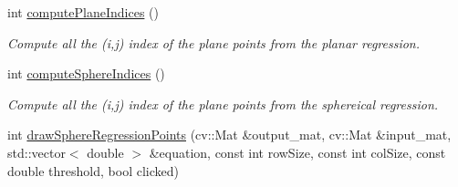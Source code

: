 \begin{DoxyCompactItemize}
int \hyperlink{class_plane_a24415419c0c06e83f2016246a8d2ee40}{compute\+Plane\+Indices} ()
\begin{DoxyCompactList}\small\item\em Compute all the (i,j) index of the plane points from the planar regression. \end{DoxyCompactList}\item 
int \hyperlink{class_plane_a279bfd98317431edcdefe43004bb257f}{compute\+Sphere\+Indices} ()
\begin{DoxyCompactList}\small\item\em Compute all the (i,j) index of the plane points from the sphereical regression. \end{DoxyCompactList}\item 
int \hyperlink{class_plane_a12c28b7eeb8cdef5451e2e90704e0673}{draw\+Sphere\+Regression\+Points} (cv\+::\+Mat \&output\+\_\+mat, cv\+::\+Mat \&input\+\_\+mat, std\+::vector$<$ double $>$ \&equation, const int row\+Size, const int col\+Size, const double threshold, bool clicked)
\end{DoxyCompactItemize}
